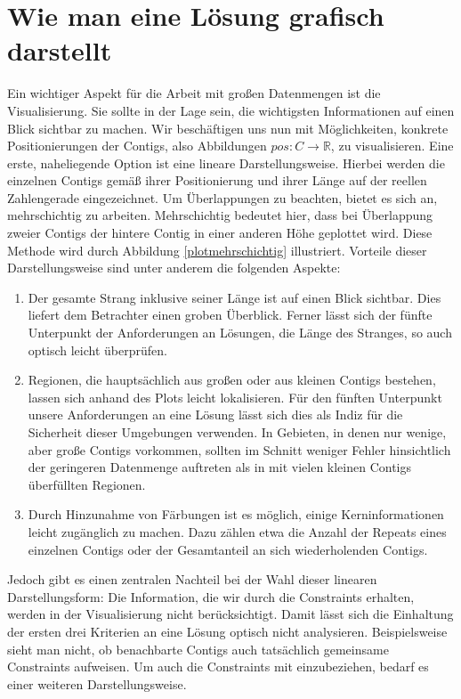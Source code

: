 \section{Wie man eine Lösung grafisch darstellt}
Ein wichtiger Aspekt für die Arbeit mit großen Datenmengen ist die Visualisierung.
Sie sollte in der Lage sein, die wichtigsten Informationen auf einen Blick sichtbar zu machen. Wir beschäftigen uns nun mit Möglichkeiten, konkrete Positionierungen der Contigs, also Abbildungen $pos: C \rightarrow \mathbb{R}$, zu visualisieren.
Eine erste, naheliegende Option ist eine lineare Darstellungsweise. Hierbei werden die einzelnen Contigs gemäß ihrer Positionierung und ihrer Länge auf der reellen Zahlengerade eingezeichnet. Um Überlappungen zu beachten, bietet es sich an, mehrschichtig zu arbeiten. Mehrschichtig bedeutet hier, dass bei Überlappung zweier Contigs der hintere Contig in einer anderen Höhe geplottet wird. Diese Methode wird durch Abbildung \ref{plotmehrschichtig} illustriert.
Vorteile dieser Darstellungsweise sind unter anderem die folgenden Aspekte:
\begin{enumerate}
\item Der gesamte Strang inklusive seiner Länge ist auf einen Blick sichtbar. Dies liefert dem Betrachter einen groben Überblick. Ferner lässt sich der fünfte Unterpunkt der Anforderungen an Lösungen, die Länge des Stranges, so auch optisch leicht überprüfen.
\item Regionen, die hauptsächlich aus großen oder aus kleinen Contigs bestehen, lassen sich anhand des Plots leicht lokalisieren. Für den fünften Unterpunkt unsere Anforderungen an eine Lösung lässt sich dies als Indiz für die Sicherheit dieser Umgebungen verwenden. In Gebieten, in denen nur wenige, aber große Contigs vorkommen, sollten im Schnitt weniger Fehler hinsichtlich der geringeren Datenmenge auftreten als in mit vielen kleinen Contigs überfüllten Regionen.
\item Durch Hinzunahme von Färbungen ist es möglich, einige Kerninformationen leicht zugänglich zu machen. Dazu zählen etwa die Anzahl der Repeats eines einzelnen Contigs oder der Gesamtanteil an sich wiederholenden Contigs.
\end{enumerate}
Jedoch gibt es einen zentralen Nachteil bei der Wahl dieser linearen Darstellungsform: Die Information, die wir durch die Constraints erhalten, werden in der Visualisierung nicht berücksichtigt.
Damit lässt sich die Einhaltung der ersten drei Kriterien an eine Lösung optisch nicht analysieren.
Beispielsweise sieht man nicht, ob benachbarte Contigs auch tatsächlich gemeinsame Constraints aufweisen.
Um auch die Constraints mit einzubeziehen, bedarf es einer weiteren Darstellungsweise.

